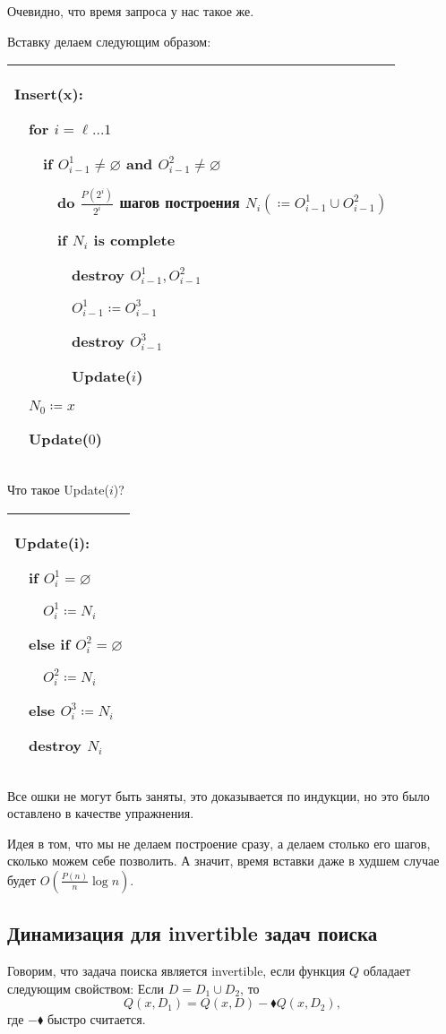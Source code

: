 Очевидно, что время запроса у нас такое же.

Вставку делаем следующим образом:

\begin{tabular}{|p{9cm}|}
\hline
Insert(x):

$\quad$for $i=\ell \ldots 1$

$\quad$$\quad$if $O^1_{i-1} \ne \varnothing$ and $O^2_{i-1} \ne \varnothing$

$\quad$$\quad$$\quad$do $\frac{P(2^i)}{2^i}$ шагов построения $N_i( \coloneqq O^1_{i-1}\cup O_{i-1}^2)$

$\quad$$\quad$$\quad$if $N_i$ is complete

$\quad$$\quad$$\quad$$\quad$destroy $O_{i-1}^1,O_{i-1}^2$

$\quad$$\quad$$\quad$$\quad$$O^1_{i-1} \coloneqq O_{i-1}^3$

$\quad$$\quad$$\quad$$\quad$destroy $O_{i-1}^3$


$\quad$$\quad$$\quad$$\quad$Update($i$)

$\quad$$N_0 \coloneqq x$

$\quad$Update($0$)\\

\hline
\end{tabular}

Что такое Update($i$)?

\begin{tabular}{|p{3cm}|}
\hline
Update(i):

$\quad$if $O^1_i=\varnothing$

$\quad$$\quad$$O^1_i \coloneqq N_i$

$\quad$else if $O_i^2 = \varnothing$

$\quad$$\quad$$O_i^2 \coloneqq N_i$

$\quad$else $O_i^3 \coloneqq N_i$

$\quad$destroy $N_i$\\

\hline
\end{tabular}






Все ошки не могут быть заняты, это доказывается по индукции, но это было оставлено в качестве упражнения.

Идея в том, что мы не делаем построение сразу, а делаем столько его шагов, сколько можем себе позволить. А значит, время вставки даже в худшем случае будет $O\left(\frac{P(n)}{n}\log n\right)$.

\subsection{Динамизация для invertible задач поиска}
\begin{definition}
Говорим, что задача поиска является invertible, если функция $Q$ обладает следующим свойством:
Если $D=D_1\cup D_2$, то
$$Q(x,D_1)=Q(x,D)-\blacklozenge Q(x,D_2),$$
где $-\blacklozenge$ быстро считается.
\end{definition}

